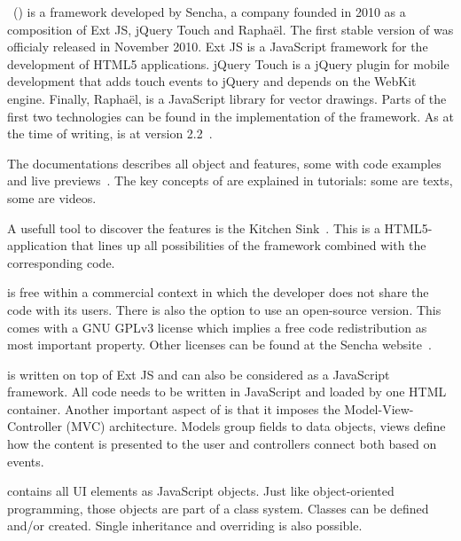 \documentclass[a4paper]{artikel3}
\newcommand{\setspace}[0]{\vspace{2mm}}
\renewcommand{\paragraph}[1]{\setspace \noindent {\bf #1}  }
\begin{document}
\st{}~(\sta{}) is a framework developed by Sencha,  a company founded in 2010 as a composition of Ext JS, jQuery Touch and Raphaël.  
The first stable version of \sta{} was officialy released in November 2010.
Ext JS is a JavaScript framework for the development of HTML5 applications.  
jQuery Touch is a jQuery plugin for mobile development that adds touch events to jQuery and depends on the WebKit engine.  
Finally,  Raphaël, is a JavaScript library for vector drawings.  
Parts of the first two technologies can be found in the implementation of the \sta{} framework.    
As at the time of writing,  \sta{} is at version 2.2~\cite{Inc.}.

\paragraph{Documentation}
The documentations describes all object and features,  some with code examples and live previews~\cite{Inc.2013a}.
The key concepts of \sta{} are explained in tutorials:  some are texts, some are videos.  

A usefull tool to discover the \sta{} features is the Kitchen Sink~\cite{Inc.2013}.  
This is a HTML5-application that lines up all possibilities of the framework combined with the corresponding code.

\paragraph{License}
\sta{} is free within a commercial context in which the developer does not share the code with its users.  
There is also the option to use an open-source version.  
This comes with a GNU GPLv3 license which implies a free code redistribution as most important property.
Other licenses can be found at the Sencha website~\cite{SenchaInc.}.
  
\paragraph{Code and development}
\sta{} is written on top of Ext JS and can also be considered as a JavaScript framework.  
All code needs to be written in JavaScript and loaded by one HTML container.  
Another important aspect of \sta{} is that it imposes the Model-View-Controller (MVC) architecture.  
Models group fields to data objects,  views define how the content is presented to the user and controllers connect both based on events.

\sta{} contains all UI elements as JavaScript objects.  
Just like object-oriented programming,  those objects are part of a class system.  
Classes can be defined and/or created.  
Single inheritance and overriding is also possible.    
\end{document}
